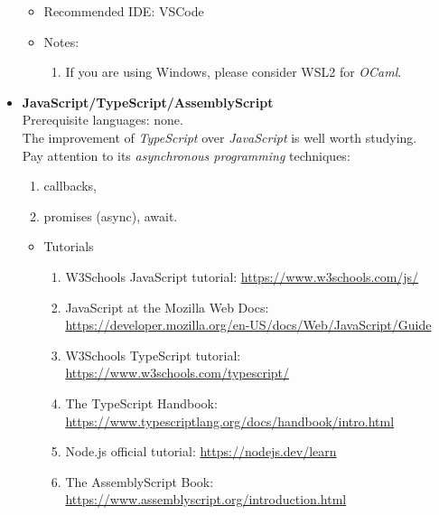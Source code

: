 \documentclass{article}
\begin{document}
\begin{itemize}
\begin{itemize}
        \item Recommended IDE: VSCode
        \item Notes:
            \begin{enumerate}
                \item If you are using Windows, please consider WSL2 for \emph{OCaml}.
            \end{enumerate}
    \end{itemize}    
    \item \textbf{JavaScript/TypeScript/AssemblyScript}\\
    Prerequisite languages: none.\\
    The improvement of \emph{TypeScript} over \emph{JavaScript} is well worth studying.\\
    Pay attention to its \emph{asynchronous programming} techniques:
    \begin{enumerate}
        \item callbacks,
        \item promises (async), await.
    \end{enumerate}
\begin{itemize}
    \item Tutorials   
    \begin{enumerate}
        \item W3Schools JavaScript tutorial:
        \href{https://www.w3schools.com/js/}{https://www.w3schools.com/js/}
        \item JavaScript at the Mozilla Web Docs:\\
        \href{https://developer.mozilla.org/en-US/docs/Web/JavaScript/Guide}{https://developer.mozilla.org/en-US/docs/Web/JavaScript/Guide}
        \item W3Schools TypeScript tutorial:
        \href{https://www.w3schools.com/typescript/}{https://www.w3schools.com/typescript/}
        \item The TypeScript Handbook:\\
        \href{https://www.typescriptlang.org/docs/handbook/intro.html}{https://www.typescriptlang.org/docs/handbook/intro.html}
        \item Node.js official tutorial:
        \href{https://nodejs.dev/learn}{https://nodejs.dev/learn}
        \item The AssemblyScript Book:\\
        \href{https://www.assemblyscript.org/introduction.html}{https://www.assemblyscript.org/introduction.html}
    \end{enumerate}

\end{itemize}
\end{itemize}
\end{document}
